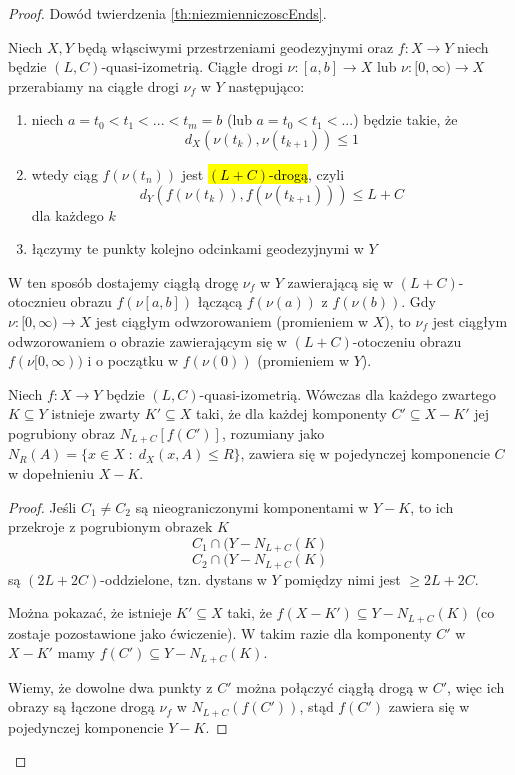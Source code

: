 \begin{proof}Dowód twierdzenia \ref{th:niezmienniczoscEnds}.

  Niech $X,Y$ będą włąsciwymi przestrzeniami geodezyjnymi oraz $f:X\to Y$ niech będzie $(L,C)$-quasi-izometrią. Ciągłe drogi $\nu:[a,b]\to X$ lub $\nu:[0,\infty)\to X$ przerabiamy na ciągłe drogi $\nu_f$ w $Y$ następująco:
  \begin{enumerate}
    \item niech $a=t_0< t_1 < ... <t_m=b$ (lub $a=t_0<t_1<...$) będzie takie, że 
      $$d_X(\nu(t_k),\nu(t_{k+1}))\leq 1$$
    \item wtedy ciąg $f(\nu(t_n))$ jest \hl{$(L+C)$-drogą}, czyli 
      $$d_Y(f(\nu(t_k)), f(\nu(t_{k+1})))\leq L+C$$ 
      dla każdego $k$
    \item łączymy te punkty kolejno odcinkami geodezyjnymi w $Y$
  \end{enumerate}
  W ten sposób dostajemy ciągłą drogę $\nu_f$ w $Y$ zawierającą się w $(L+C)$-otocznieu obrazu $f(\nu[a,b])$ łączącą $f(\nu(a))$ z $f(\nu(b))$. Gdy $\nu:[0,\infty)\to X$ jest ciągłym odwzorowaniem (promieniem w $X$), to $\nu_f$ jest ciągłym odwzorowaniem o obrazie zawierającym się w $(L+C)$-otoczeniu obrazu $f(\nu[0,\infty))$ i o początku w $f(\nu(0))$ (promieniem w $Y$).

  \begin{lemma}{}{}
    Niech $f:X\to Y$ będzie $(L,C)$-quasi-izometrią. Wówczas dla każdego zwartego $K\subseteq Y$ istnieje zwarty $K'\subseteq X$ taki, że dla każdej komponenty $C'\subseteq X-K'$ jej pogrubiony obraz $N_{L+C}[f(C')]$, rozumiany jako $N_R(A)=\{x\in X\;:\;d_X(x, A)\leq R\}$, zawiera się w pojedynczej komponencie $C$ w dopełnieniu $X-K$.
  \end{lemma}

  \begin{proof}
    Jeśli $C_1\neq C_2$ są nieograniczonymi komponentami w $Y-K$, to ich przekroje z pogrubionym obrazek $K$ 
    $$C_1\cap (Y-N_{L+C}(K)$$ 
    $$C_2\cap (Y-N_{L+C}(K)$$
    są $(2L+2C)$-oddzielone, tzn. dystans w $Y$ pomiędzy nimi jest $\geq 2L+2C$.

    Można pokazać, że istnieje $K'\subseteq X$ taki, że $f(X-K')\subseteq Y-N_{L+C}(K)$ (co zostaje pozostawione jako ćwiczenie). W takim razie dla komponenty $C'$ w $X-K'$ mamy $f(C')\subseteq Y-N_{L+C}(K)$.

    Wiemy, że dowolne dwa punkty z $C'$ można połączyć ciągłą drogą w $C'$, więc ich obrazy są łączone drogą $\nu_f$ w $N_{L+C}(f(C'))$, stąd $f(C')$ zawiera się w pojedynczej komponencie $Y-K$.
  \end{proof}


\end{proof}
